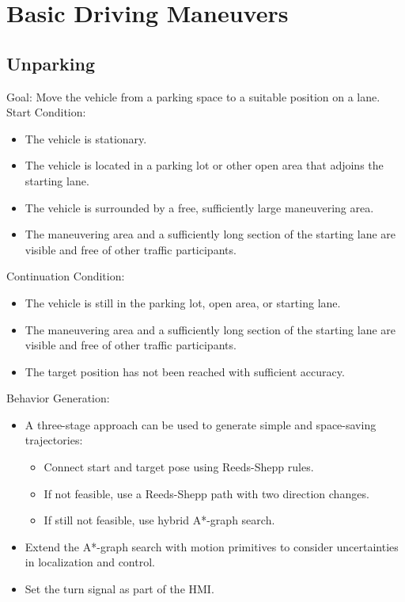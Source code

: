 \section{Basic Driving Maneuvers}
\subsection{Unparking}
Goal: Move the vehicle from a parking space to a suitable position on a lane.
Start Condition:

\begin{itemize}
    \item The vehicle is stationary.
    \item The vehicle is located in a parking lot or other open area that adjoins the starting lane.
    \item The vehicle is surrounded by a free, sufficiently large maneuvering area.
    \item The maneuvering area and a sufficiently long section of the starting lane are visible and free of other traffic participants.
\end{itemize}

Continuation Condition:

\begin{itemize}
    \item The vehicle is still in the parking lot, open area, or starting lane.
    \item The maneuvering area and a sufficiently long section of the starting lane are visible and free of other traffic participants.
    \item The target position has not been reached with sufficient accuracy.
\end{itemize}

Behavior Generation:

\begin{itemize}
    \item A three-stage approach can be used to generate simple and space-saving trajectories:
          \begin{itemize}
              \item Connect start and target pose using Reeds-Shepp rules.
              \item If not feasible, use a Reeds-Shepp path with two direction changes.
              \item If still not feasible, use hybrid A*-graph search.
          \end{itemize}
    \item Extend the A*-graph search with motion primitives to consider uncertainties in localization and control.
    \item Set the turn signal as part of the HMI.
\end{itemize}

